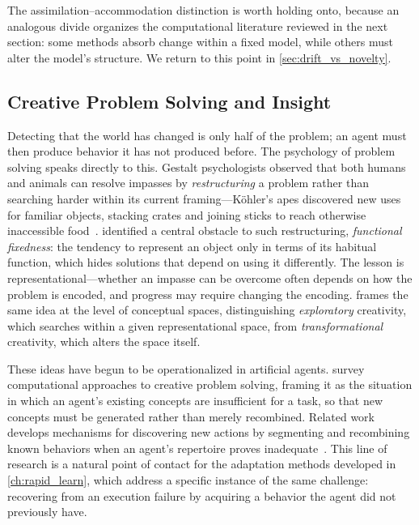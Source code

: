 The assimilation--accommodation distinction is worth holding onto, because an analogous divide organizes the computational literature reviewed in the next section: some methods absorb change within a fixed model, while others must alter the model's structure. We return to this point in \cref{sec:drift_vs_novelty}.

\subsection{Creative Problem Solving and Insight}
\label{sec:novelty_cps}

Detecting that the world has changed is only half of the problem; an agent must then produce behavior it has not produced before. The psychology of problem solving speaks directly to this. Gestalt psychologists observed that both humans and animals can resolve impasses by \emph{restructuring} a problem rather than searching harder within its current framing---K{\"o}hler's apes discovered new uses for familiar objects, stacking crates and joining sticks to reach otherwise inaccessible food~\citep{kohler1925mentality}. \citet{duncker1945problem} identified a central obstacle to such restructuring, \emph{functional fixedness}: the tendency to represent an object only in terms of its habitual function, which hides solutions that depend on using it differently. The lesson is representational---whether an impasse can be overcome often depends on how the problem is encoded, and progress may require changing the encoding. \citet{boden2004creative} frames the same idea at the level of conceptual spaces, distinguishing \emph{exploratory} creativity, which searches within a given representational space, from \emph{transformational} creativity, which alters the space itself.

These ideas have begun to be operationalized in artificial agents. \citet{gizzi2022cps} survey computational approaches to creative problem solving, framing it as the situation in which an agent's existing concepts are insufficient for a task, so that new concepts must be generated rather than merely recombined. Related work develops mechanisms for discovering new actions by segmenting and recombining known behaviors when an agent's repertoire proves inadequate~\citep{gizzi2019creative}. This line of research is a natural point of contact for the adaptation methods developed in \cref{ch:rapid_learn}, which address a specific instance of the same challenge: recovering from an execution failure by acquiring a behavior the agent did not previously have.

